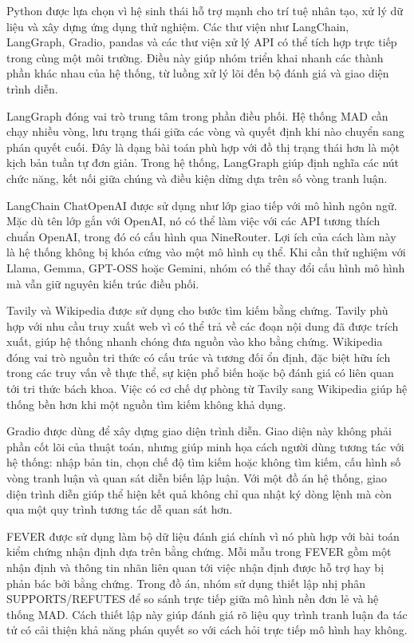 ﻿\documentclass[oneside,a4paper,12pt]{extreport}
\begin{document}
Python được lựa chọn vì hệ sinh thái hỗ trợ mạnh cho trí tuệ nhân tạo, xử lý dữ liệu và xây dựng ứng dụng thử nghiệm. Các thư viện như LangChain, LangGraph, Gradio, pandas và các thư viện xử lý API có thể tích hợp trực tiếp trong cùng một môi trường. Điều này giúp nhóm triển khai nhanh các thành phần khác nhau của hệ thống, từ luồng xử lý lõi đến bộ đánh giá và giao diện trình diễn.

LangGraph đóng vai trò trung tâm trong phần điều phối. Hệ thống MAD cần chạy nhiều vòng, lưu trạng thái giữa các vòng và quyết định khi nào chuyển sang phán quyết cuối. Đây là dạng bài toán phù hợp với đồ thị trạng thái hơn là một kịch bản tuần tự đơn giản. Trong hệ thống, LangGraph giúp định nghĩa các nút chức năng, kết nối giữa chúng và điều kiện dừng dựa trên số vòng tranh luận.

LangChain ChatOpenAI được sử dụng như lớp giao tiếp với mô hình ngôn ngữ. Mặc dù tên lớp gắn với OpenAI, nó có thể làm việc với các API tương thích chuẩn OpenAI, trong đó có cấu hình qua NineRouter. Lợi ích của cách làm này là hệ thống không bị khóa cứng vào một mô hình cụ thể. Khi cần thử nghiệm với Llama, Gemma, GPT-OSS hoặc Gemini, nhóm có thể thay đổi cấu hình mô hình mà vẫn giữ nguyên kiến trúc điều phối.

Tavily và Wikipedia được sử dụng cho bước tìm kiếm bằng chứng. Tavily phù hợp với nhu cầu truy xuất web vì có thể trả về các đoạn nội dung đã được trích xuất, giúp hệ thống nhanh chóng đưa nguồn vào kho bằng chứng. Wikipedia đóng vai trò nguồn tri thức có cấu trúc và tương đối ổn định, đặc biệt hữu ích trong các truy vấn về thực thể, sự kiện phổ biến hoặc bộ đánh giá có liên quan tới tri thức bách khoa. Việc có cơ chế dự phòng từ Tavily sang Wikipedia giúp hệ thống bền hơn khi một nguồn tìm kiếm không khả dụng.

Gradio được dùng để xây dựng giao diện trình diễn. Giao diện này không phải phần cốt lõi của thuật toán, nhưng giúp minh họa cách người dùng tương tác với hệ thống: nhập bản tin, chọn chế độ tìm kiếm hoặc không tìm kiếm, cấu hình số vòng tranh luận và quan sát diễn biến lập luận. Với một đồ án hệ thống, giao diện trình diễn giúp thể hiện kết quả không chỉ qua nhật ký dòng lệnh mà còn qua một quy trình tương tác dễ quan sát hơn.

FEVER được sử dụng làm bộ dữ liệu đánh giá chính vì nó phù hợp với bài toán kiểm chứng nhận định dựa trên bằng chứng. Mỗi mẫu trong FEVER gồm một nhận định và thông tin nhãn liên quan tới việc nhận định được hỗ trợ hay bị phản bác bởi bằng chứng. Trong đồ án, nhóm sử dụng thiết lập nhị phân SUPPORTS/REFUTES để so sánh trực tiếp giữa mô hình nền đơn lẻ và hệ thống MAD. Cách thiết lập này giúp đánh giá rõ liệu quy trình tranh luận đa tác tử có cải thiện khả năng phán quyết so với cách hỏi trực tiếp mô hình hay không.
\end{document}
